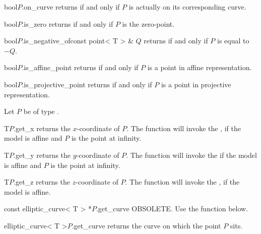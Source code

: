 \begin{cfcode}{bool}{$P$.on_curve}{}
  returns \TRUE if and only if $P$ is actually on its corresponding curve.
\end{cfcode}

\begin{cfcode}{bool}{$P$.is_zero}{}
  returns \TRUE if and only if $P$ is the zero-point.
\end{cfcode}

\begin{cfcode}{bool}{$P$.is_negative_of}{const point< T > & $Q$}
  returns \TRUE if and only if $P$ is equal to $-Q$.
\end{cfcode}

\begin{cfcode}{bool}{$P$.is_affine_point}{}
  returns \TRUE if and only if $P$ is a point in affine representation.
\end{cfcode}

\begin{cfcode}{bool}{$P$.is_projective_point}{}
  returns \TRUE if and only if $P$ is a point in projective representation.
\end{cfcode}


\ACCS

Let $P$ be of type .

\begin{cfcode}{T}{$P$.get_x}{}
  returns the $x$-coordinate of $P$.  The function will invoke the \LEH, if the model is affine
  and $P$ is the point at infinity.
\end{cfcode}

\begin{cfcode}{T}{$P$.get_y}{}
  returns the $y$-coordinate of $P$.  The function will invoke the \LEH if the model is affine
  and $P$ is the point at infinity.
\end{cfcode}

\begin{cfcode}{T}{$P$.get_z}{}
  returns the $z$-coordinate of $P$.  The function will invoke the \LEH, if the model is affine.
\end{cfcode}

\begin{cfcode}{const elliptic_curve< T > *}{$P$.get_curve}{}
  OBSOLETE.  Use the function below.
\end{cfcode}

\begin{cfcode}{elliptic_curve< T >}{$P$.get_curve}{}
  returns the curve on which the point $P$ sits.
\end{cfcode}


